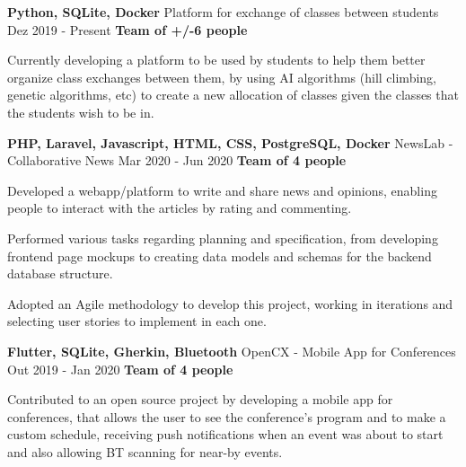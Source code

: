 
\begin{cventries}

  \cventry
    {\textbf{Python, SQLite, Docker}}
    {Platform for exchange of classes between students}
    {Dez 2019 - Present}
    {\textbf{Team of +/-6 people}}
    {
      \begin{cvitems} %
        \item {Currently developing a platform to be used by students to help them better organize class exchanges between them, by using AI algorithms (hill climbing, genetic algorithms, etc) to create a new allocation of classes given the classes that the students wish to be in.}
      \end{cvitems}
    }

  \cventry
    {\textbf{PHP, Laravel, Javascript, HTML, CSS, PostgreSQL, Docker}} %
    {NewsLab - Collaborative News \href{https://github.com/EduRibeiro00/NewsLab-feup-lbaw}{\faExternalLink}} %
    {Mar 2020 - Jun 2020} %
    {\textbf{Team of 4 people}} %
    {
      \begin{cvitems} %
        \item {Developed a webapp/platform to write and share news and opinions, enabling people to interact with the articles by rating and commenting.}
        \item {Performed various tasks regarding planning and specification, from developing frontend page mockups to creating data models and schemas for the backend database structure.}
        \item {Adopted an Agile methodology to develop this project, working in iterations and selecting user stories to implement in each one.}
      \end{cvitems}
    }

  \cventry
    {\textbf{Flutter, SQLite, Gherkin, Bluetooth}} %
    {OpenCX - Mobile App for Conferences \href{https://github.com/open-cx/open-cx}{\faExternalLink}} %
    {Out 2019 - Jan 2020} %
    {\textbf{Team of 4 people}} %
    {
      \begin{cvitems} %
        \item {Contributed to an open source project by developing a mobile app for conferences, that allows the user to see the conference's program and to make a custom schedule, receiving push notifications when an event was about to start and also allowing BT scanning for near-by events.}
      \end{cvitems}
    }


\end{cventries}
